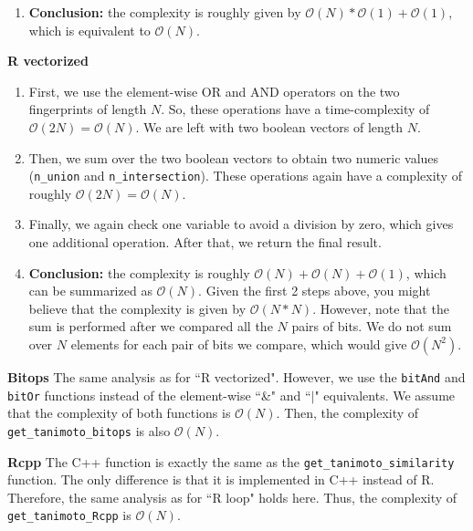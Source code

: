 \documentclass[a4paper,11pt]{article}\usepackage[]{graphicx}\usepackage[]{xcolor}
\newcommand{\code}[1]{\texttt{#1}}
\begin{document}
\begin{enumerate}
\begin{enumerate}
\begin{enumerate}
\item \textbf{Conclusion:} the complexity is roughly given by $\mathcal{O}(N) * \mathcal{O}(1) + \mathcal{O}(1)$, which is equivalent to $\mathcal{O}(N)$. 
\end{enumerate}


\textbf{R vectorized}
\begin{enumerate}
\item First, we use the element-wise OR and AND operators on the two fingerprints of length $N$. So, these operations have a time-complexity of $\mathcal{O}(2N) = \mathcal{O}(N)$. We are left with two boolean vectors of length $N$. 

\item Then, we sum over the two boolean vectors to obtain two numeric values (\code{n\_union} and \code{n\_intersection}). These operations again have a complexity of roughly $\mathcal{O}(2N) = \mathcal{O}(N)$.

\item Finally, we again check one variable to avoid a division by zero, which gives one additional operation. After that, we return the final result. 

\item \textbf{Conclusion:} the complexity is roughly $\mathcal{O}(N) + \mathcal{O}(N) + \mathcal{O}(1)$, which can be summarized as $\mathcal{O}(N)$. Given the first 2 steps above, you might believe that the complexity is given by $\mathcal{O}(N * N)$. However, note that the sum is performed after we compared all the $N$ pairs of bits. We do not sum over $N$ elements for each pair of bits we compare, which would give $\mathcal{O}(N^2)$. 
\end{enumerate}


\textbf{Bitops} \newline
The same analysis as for ``R vectorized". However, we use the \code{bitAnd} and \code{bitOr} functions instead of the element-wise ``\&" and ``$|$" equivalents. We assume that the complexity of both functions is $\mathcal{O}(N)$. Then, the complexity of \code{get\_tanimoto\_bitops} is also $\mathcal{O}(N)$. 

\textbf{Rcpp} \newline
The C++ function is exactly the same as the \code{get\_tanimoto\_similarity} function. The only difference is that it is implemented in C++ instead of R. Therefore, the same analysis as for ``R loop" holds here. Thus, the complexity of \code{get\_tanimoto\_Rcpp} is $\mathcal{O}(N)$.  





\end{enumerate}
\end{enumerate}
\end{document}

